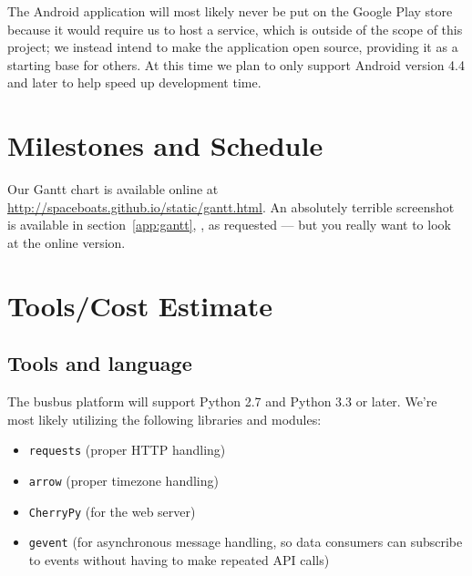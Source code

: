 \documentclass[12pt]{article}
\begin{document}
The Android application will most likely never
be put on the Google Play store because it would require us to host a service, which is outside of the scope of this
project; we instead intend to make the application open source, providing it as a starting base for others.
At this time we plan to only support Android version 4.4 and later to help speed up development time.

\section{Milestones and Schedule}
Our Gantt chart is available online at \url{http://spaceboats.github.io/static/gantt.html}.
An absolutely terrible screenshot is available in section~\ref{app:gantt}, \textit{}, as requested --- but you really want to look at the online version.

\section{Tools/Cost Estimate}
\subsection{Tools and language}
The busbus platform will support Python 2.7 and Python 3.3 or later. We're most likely utilizing the following
libraries and modules:
\begin{itemize}
	\item \texttt{requests} (proper HTTP handling)
	\item \texttt{arrow} (proper timezone handling)
	\item \texttt{CherryPy} (for the web server)
	\item \texttt{gevent} (for asynchronous message handling, so data consumers can subscribe to events
		without having to make repeated API calls)
\end{itemize}
\end{document}
